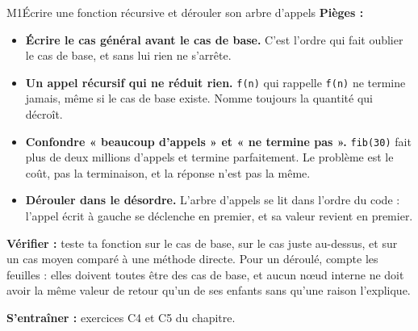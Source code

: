 \begin{fichemethode}{M1}{Écrire une fonction récursive et dérouler son arbre d'appels}
\textbf{Pièges :}
\begin{itemize}
  \item \textbf{Écrire le cas général avant le cas de base.} C'est l'ordre qui fait oublier le
    cas de base, et sans lui rien ne s'arrête.
  \item \textbf{Un appel récursif qui ne réduit rien.} \lstinline{f(n)} qui rappelle
    \lstinline{f(n)} ne termine jamais, même si le cas de base existe. Nomme toujours la
    quantité qui décroît.
  \item \textbf{Confondre « beaucoup d'appels » et « ne termine pas ».}
    \lstinline{fib(30)} fait plus de deux millions d'appels et termine parfaitement. Le
    problème est le coût, pas la terminaison, et la réponse n'est pas la même.
  \item \textbf{Dérouler dans le désordre.} L'arbre d'appels se lit dans l'ordre du code :
    l'appel écrit à gauche se déclenche en premier, et sa valeur revient en premier.
\end{itemize}

\textbf{Vérifier :} teste ta fonction sur le cas de base, sur le cas juste au-dessus, et sur
un cas moyen comparé à une méthode directe. Pour un déroulé, compte les feuilles : elles
doivent toutes être des cas de base, et aucun nœud interne ne doit avoir la même valeur de
retour qu'un de ses enfants sans qu'une raison l'explique.

\textbf{S'entraîner :} exercices C4 et C5 du chapitre.
\end{fichemethode}
